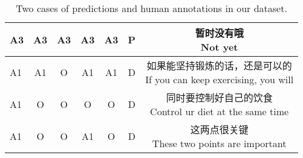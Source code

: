 \documentclass[11pt,a4paper]{article}
\begin{document}
\begin{CJK}{UTF8}{gbsn}
\begin{table*}[h]
\begin{tabular}{p{1.5cm}<{\centering}cccccc}
		\hline
		A3&A3&A3&A3&A3&P&\makecell{暂时没有哦\\Not yet}\\
		\hline
		A1&A1&O &A1&A1&D&\makecell{如果能坚持锻炼的话，还是可以的\\If you can keep exercising, you will}\\
		\hline
		A1&O &O &O &O &D&\makecell{同时要控制好自己的饮食\\Control ur diet at the same time}\\
		\hline
		A1&O &O &A1&O &D&\makecell{这两点很关键\\These two points are important}\\			
		\bottomrule[1.3pt]
	\end{tabular}
	\caption{Two cases of predictions and human annotations in our dataset.}
	\label{tab:case1}
\end{table*}


\end{CJK}
\end{document}
